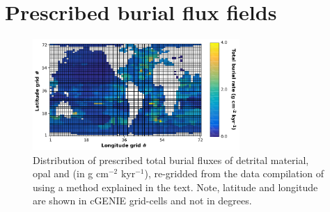 \documentclass[gmd, manuscript]{copernicus}
\begin{document}
\section{Prescribed burial flux fields} 
\begin{figure}[hbp]
\begin{center}
	\includegraphics[width=0.7\textwidth]{figures/OMEN-GENIE-Exp/Solid_field_mask.pdf}
	\caption[Distribution of prescribed total burial fluxes of detrital material, opal and ]{Distribution of prescribed total burial fluxes of detrital material, opal and  (in g cm$^{-2}$ kyr$^{-1}$), 
	re-gridded from the data compilation of \citet{archer_data-driven_1996} using a method explained in the text. Note, latitude and longitude are shown in cGENIE grid-cells and not in degrees.}
	\label{fig:GENIE_sum_burial_flux}
	\end{center}
\end{figure}





\newpage






\end{document}
